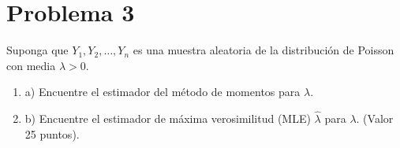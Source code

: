 \section{Problema 3}

Suponga que $Y_{1}, Y_{2}, \ldots, Y_{n}$ es una muestra aleatoria de la distribución de Poisson con media $\lambda>0$.

\begin{enumerate}
	\item a) Encuentre el estimador del método de momentos para $\lambda$.
	\item b) Encuentre el estimador de máxima verosimilitud (MLE) $\hat{\lambda}$ para $\lambda$. (Valor 25 puntos).
\end{enumerate}
